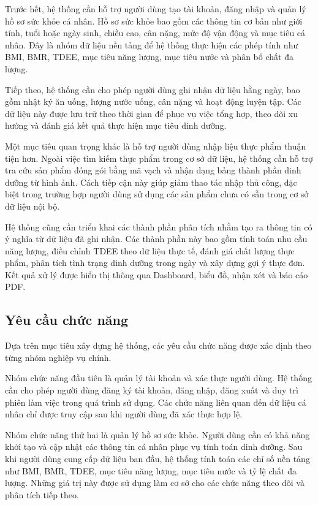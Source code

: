 \documentclass[12pt, a4paper]{report}
\begin{document}
Trước hết, hệ thống cần hỗ trợ người dùng tạo tài khoản, đăng nhập và quản lý hồ sơ sức khỏe cá nhân. Hồ sơ sức khỏe bao gồm các thông tin cơ bản như giới tính, tuổi hoặc ngày sinh, chiều cao, cân nặng, mức độ vận động và mục tiêu cá nhân. Đây là nhóm dữ liệu nền tảng để hệ thống thực hiện các phép tính như BMI, BMR, TDEE, mục tiêu năng lượng, mục tiêu nước và phân bổ chất đa lượng.

Tiếp theo, hệ thống cần cho phép người dùng ghi nhận dữ liệu hằng ngày, bao gồm nhật ký ăn uống, lượng nước uống, cân nặng và hoạt động luyện tập. Các dữ liệu này được lưu trữ theo thời gian để phục vụ việc tổng hợp, theo dõi xu hướng và đánh giá kết quả thực hiện mục tiêu dinh dưỡng.

Một mục tiêu quan trọng khác là hỗ trợ người dùng nhập liệu thực phẩm thuận tiện hơn. Ngoài việc tìm kiếm thực phẩm trong cơ sở dữ liệu, hệ thống cần hỗ trợ tra cứu sản phẩm đóng gói bằng mã vạch và nhận dạng bảng thành phần dinh dưỡng từ hình ảnh. Cách tiếp cận này giúp giảm thao tác nhập thủ công, đặc biệt trong trường hợp người dùng sử dụng các sản phẩm chưa có sẵn trong cơ sở dữ liệu nội bộ.

Hệ thống cũng cần triển khai các thành phần phân tích nhằm tạo ra thông tin có ý nghĩa từ dữ liệu đã ghi nhận. Các thành phần này bao gồm tính toán nhu cầu năng lượng, điều chỉnh TDEE theo dữ liệu thực tế, đánh giá chất lượng thực phẩm, phân tích tình trạng dinh dưỡng trong ngày và xây dựng gợi ý thực đơn. Kết quả xử lý được hiển thị thông qua Dashboard, biểu đồ, nhận xét và báo cáo PDF.

\subsection{Yêu cầu chức năng}
Dựa trên mục tiêu xây dựng hệ thống, các yêu cầu chức năng được xác định theo từng nhóm nghiệp vụ chính.

Nhóm chức năng đầu tiên là quản lý tài khoản và xác thực người dùng. Hệ thống cần cho phép người dùng đăng ký tài khoản, đăng nhập, đăng xuất và duy trì phiên làm việc trong quá trình sử dụng. Các chức năng liên quan đến dữ liệu cá nhân chỉ được truy cập sau khi người dùng đã xác thực hợp lệ.

Nhóm chức năng thứ hai là quản lý hồ sơ sức khỏe. Người dùng cần có khả năng khởi tạo và cập nhật các thông tin cá nhân phục vụ tính toán dinh dưỡng. Sau khi người dùng cung cấp dữ liệu ban đầu, hệ thống tính toán các chỉ số nền tảng như BMI, BMR, TDEE, mục tiêu năng lượng, mục tiêu nước và tỷ lệ chất đa lượng. Những giá trị này được sử dụng làm cơ sở cho các chức năng theo dõi và phân tích tiếp theo.
\end{document}
